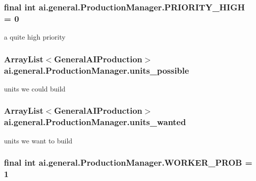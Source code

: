 \label{classai_1_1general_1_1_production_manager_abab8287080aab2971b459ab329305aa2}
\hypertarget{classai_1_1general_1_1_production_manager_a96f76dd3e3ab3baaa69b1470a4807984}{
\subsubsection[{PRIORITY\_\-HIGH}]{\setlength{\rightskip}{0pt plus 5cm}final int {\bf ai.general.ProductionManager.PRIORITY\_\-HIGH} = 0}}
\label{classai_1_1general_1_1_production_manager_a96f76dd3e3ab3baaa69b1470a4807984}
a quite high priority \hypertarget{classai_1_1general_1_1_production_manager_aec5af2aa2d240356ddfa8df81d796693}{
\subsubsection[{units\_\-possible}]{\setlength{\rightskip}{0pt plus 5cm}ArrayList$<${\bf GeneralAIProduction}$>$ {\bf ai.general.ProductionManager.units\_\-possible}}}
\label{classai_1_1general_1_1_production_manager_aec5af2aa2d240356ddfa8df81d796693}
units we could build \hypertarget{classai_1_1general_1_1_production_manager_a59ddfa5781a8e7198818bf1c3987b9e3}{
\subsubsection[{units\_\-wanted}]{\setlength{\rightskip}{0pt plus 5cm}ArrayList$<${\bf GeneralAIProduction}$>$ {\bf ai.general.ProductionManager.units\_\-wanted}}}
\label{classai_1_1general_1_1_production_manager_a59ddfa5781a8e7198818bf1c3987b9e3}
units we want to build \hypertarget{classai_1_1general_1_1_production_manager_afe60230ce2b887ac1eb35061f9c0fbaa}{
\subsubsection[{WORKER\_\-PROB}]{\setlength{\rightskip}{0pt plus 5cm}final int {\bf ai.general.ProductionManager.WORKER\_\-PROB} = 1}}
